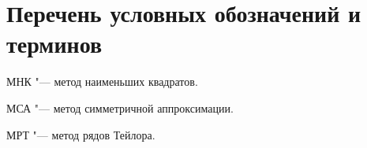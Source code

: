 \chapter*{Перечень условных обозначений и терминов}

МНК "--- метод наименьших квадратов.

МСА "--- метод симметричной аппроксимации.

МРТ "--- метод рядов Тейлора.
